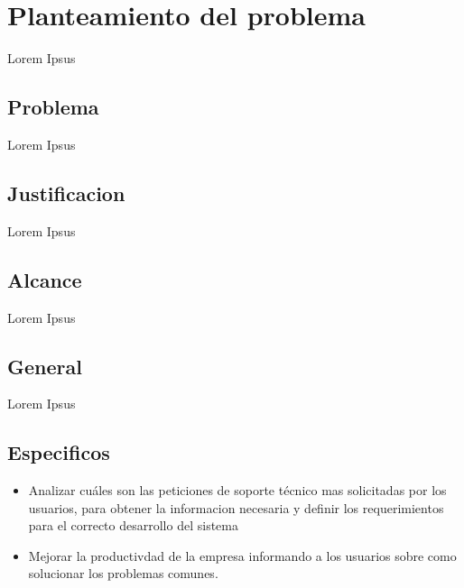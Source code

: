 \documentclass[preprint,12pt]{elsarticle}
\begin{document}


\section{Planteamiento del problema}
Lorem Ipsus


\subsection {\textbf{Problema}}
Lorem Ipsus


\subsection {\textbf{Justificacion}}

Lorem Ipsus


\subsection {\textbf{Alcance}}
Lorem Ipsus




\subsection{\textbf{General}}

Lorem Ipsus


\subsection{\textbf{Especificos}}

\begin{itemize}

\item Analizar cuáles son las peticiones de soporte técnico mas solicitadas por los usuarios, para obtener la informacion necesaria y definir los requerimientos para el correcto desarrollo del sistema
\item Mejorar la productivdad de la empresa informando a los usuarios sobre como solucionar los problemas comunes.
\end{itemize}
\end{document}
